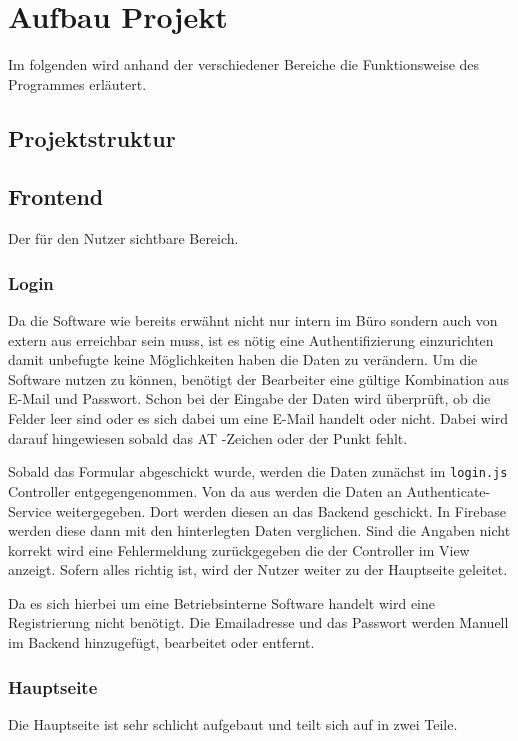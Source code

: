 \chapter{Aufbau Projekt}
Im folgenden wird anhand der verschiedener Bereiche die Funktionsweise des Programmes erläutert. 

\section{Projektstruktur}


\section{Frontend}
Der für den Nutzer sichtbare Bereich.
\subsection{Login}
Da die Software wie bereits erwähnt nicht nur intern im Büro sondern auch von extern aus erreichbar sein muss, ist es nötig eine Authentifizierung einzurichten damit unbefugte keine Möglichkeiten haben die Daten zu verändern. Um die Software nutzen zu können, benötigt der Bearbeiter eine gültige Kombination aus E-Mail und Passwort. Schon bei der Eingabe der Daten wird überprüft, ob die Felder leer sind oder es sich dabei um eine E-Mail handelt oder nicht. Dabei wird darauf hingewiesen sobald das AT -Zeichen oder der Punkt fehlt. 

Sobald das Formular abgeschickt wurde, werden die Daten zunächst im \texttt{login.js} Controller entgegengenommen. Von da aus werden die Daten an Authenticate-Service weitergegeben. Dort werden diesen an das Backend geschickt. In Firebase werden diese dann mit den hinterlegten Daten verglichen. Sind die Angaben nicht korrekt wird eine Fehlermeldung zurückgegeben die der Controller im View anzeigt. Sofern alles richtig ist, wird der Nutzer weiter zu der Hauptseite geleitet. 

Da es sich hierbei um eine Betriebsinterne Software handelt wird eine Registrierung nicht benötigt. Die Emailadresse und das Passwort werden Manuell im Backend hinzugefügt, bearbeitet oder entfernt. 

\subsection{Hauptseite}
Die Hauptseite ist sehr schlicht aufgebaut und teilt sich auf in zwei Teile. 

